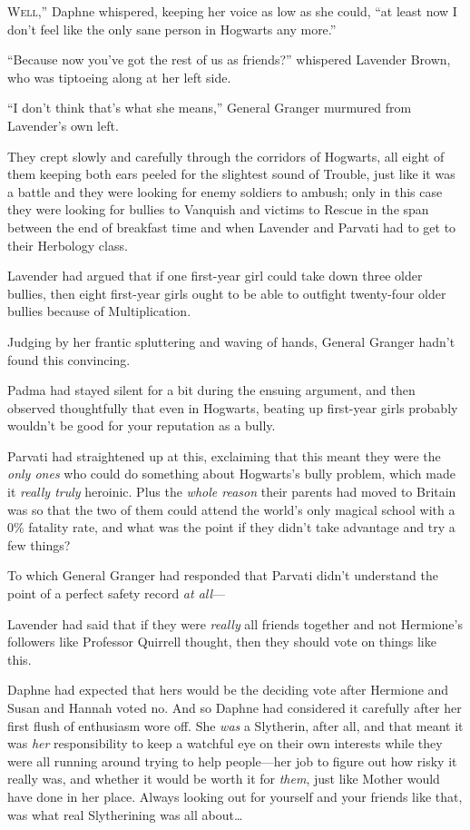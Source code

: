 
\lettrine[ante=“]{W}{ell},” Daphne whispered, keeping her voice as low as she could, “at least now I don’t feel like the only sane person in Hogwarts any more.”

“Because now you’ve got the rest of us as friends?” whispered Lavender Brown, who was tiptoeing along at her left side.

“I don’t think that’s what she means,” General Granger murmured from Lavender’s own left.

They crept slowly and carefully through the corridors of Hogwarts, all eight of them keeping both ears peeled for the slightest sound of Trouble, just like it was a battle and they were looking for enemy soldiers to ambush; only in this case they were looking for bullies to Vanquish and victims to Rescue in the span between the end of breakfast time and when Lavender and Parvati had to get to their Herbology class.

Lavender had argued that if one first-year girl could take down three older bullies, then eight first-year girls ought to be able to outfight twenty-four older bullies because of Multiplication.

Judging by her frantic spluttering and waving of hands, General Granger hadn’t found this convincing.

Padma had stayed silent for a bit during the ensuing argument, and then observed thoughtfully that even in Hogwarts, beating up first-year girls probably wouldn’t be good for your reputation as a bully.

Parvati had straightened up at this, exclaiming that this meant they were the \emph{only ones} who could do something about Hogwarts’s bully problem, which made it \emph{really truly} heroinic. Plus the \emph{whole reason} their parents had moved to Britain was so that the two of them could attend the world’s only magical school with a 0\% fatality rate, and what was the point if they didn’t take advantage and try a few things?

To which General Granger had responded that Parvati didn’t understand the point of a perfect safety record \emph{at all}—

Lavender had said that if they were \emph{really} all friends together and not Hermione’s followers like Professor Quirrell thought, then they should vote on things like this.

Daphne had expected that hers would be the deciding vote after Hermione and Susan and Hannah voted no. And so Daphne had considered it carefully after her first flush of enthusiasm wore off. She \emph{was} a Slytherin, after all, and that meant it was \emph{her} responsibility to keep a watchful eye on their own interests while they were all running around trying to help people—her job to figure out how risky it really was, and whether it would be worth it for \emph{them}, just like Mother would have done in her place. Always looking out for yourself and your friends like that, was what real Slytherining was all about…

